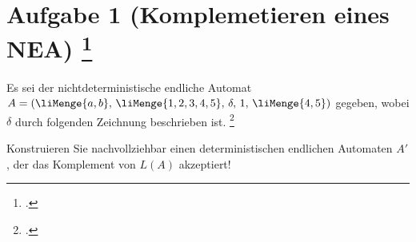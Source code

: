 \documentclass{lehramt-informatik-aufgabe}
\begin{document}
\let\m=\liMenge

\section{Aufgabe 1 (Komplemetieren eines NEA)
\footcite{46115:2019:09}}

Es sei der nichtdeterministische endliche Automat $A = (\m{a, b},\, \m{1,
2, 3, 4, 5},\, \delta,\, 1,\, \m{4, 5})$ gegeben, wobei $\delta$ durch
folgenden Zeichnung beschrieben ist.
\footcite[Seite 17, Aufgabe 11]{theo:ab:1}

\begin{liAntwort}
\begin{center}
\end{center}
\end{liAntwort}

Konstruieren Sie nachvollziehbar einen deterministischen endlichen
Automaten $A'$ , der das Komplement von $L(A)$ akzeptiert!
\end{document}
